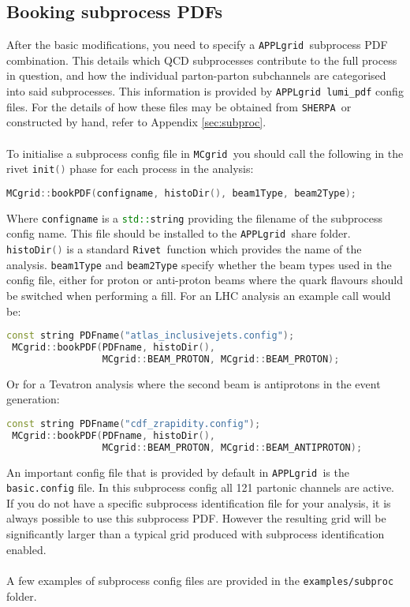 \documentclass[11pt]{article}
\newcommand{\mcgrid} {{\tt MCgrid }}
\newcommand{\rivet} {{\tt Rivet }}
\newcommand{\appl} {{\tt APPLgrid }}
\newcommand{\sherpa} {{\tt SHERPA }}
\begin{document}
\subsection{Booking subprocess PDFs}
After the basic modifications, you need to specify a \appl subprocess PDF combination. This details which QCD subprocesses contribute to the full process in question, and how the individual parton-parton subchannels are categorised into said subprocesses. This information is provided by \appl \lstinline[language=c++]{lumi_pdf} config files. For the details of how these files may be obtained from \sherpa or constructed by hand, refer to Appendix \ref{sec:subproc}.\\\\
To initialise a subprocess config file in \mcgrid you should call the following in the rivet \lstinline[language=c++]{init()} phase for each process in the analysis:
\begin{lstlisting}[language=c++]
 MCgrid::bookPDF(configname, histoDir(), beam1Type, beam2Type);
\end{lstlisting}
Where \lstinline[language=c++]{configname} is a \lstinline[language=c++]{std::string} providing the filename of the subprocess config name. This file should be installed to the \appl share folder. \lstinline[language=c++]{histoDir()} is a standard \rivet function which provides the name of the analysis. \lstinline[language=c++]{beam1Type} and \lstinline[language=c++]{beam2Type} specify whether the beam types used in the config file, either for proton or anti-proton beams where the quark flavours should be switched when performing a fill. For an LHC analysis an example call would be:
\begin{lstlisting}[language=c++]
 const string PDFname("atlas_inclusivejets.config");
 MCgrid::bookPDF(PDFname, histoDir(),
                 MCgrid::BEAM_PROTON, MCgrid::BEAM_PROTON);
\end{lstlisting}
Or for a Tevatron analysis where the second beam is antiprotons in the event generation:
\begin{lstlisting}[language=c++]
 const string PDFname("cdf_zrapidity.config");
 MCgrid::bookPDF(PDFname, histoDir(),
                 MCgrid::BEAM_PROTON, MCgrid::BEAM_ANTIPROTON);
\end{lstlisting}
An important config file that is provided by default in \appl is the \lstinline[language=bash]{basic.config} file. In this subprocess config all 121 partonic channels are active. If you do not have a specific subprocess identification file for your analysis, it is always possible to use this subprocess PDF. However the resulting grid will be significantly larger than a typical grid produced with subprocess identification enabled. \\\\
A few examples of subprocess config files are provided in the \lstinline[language=bash]{examples/subproc} folder.
\end{document}
